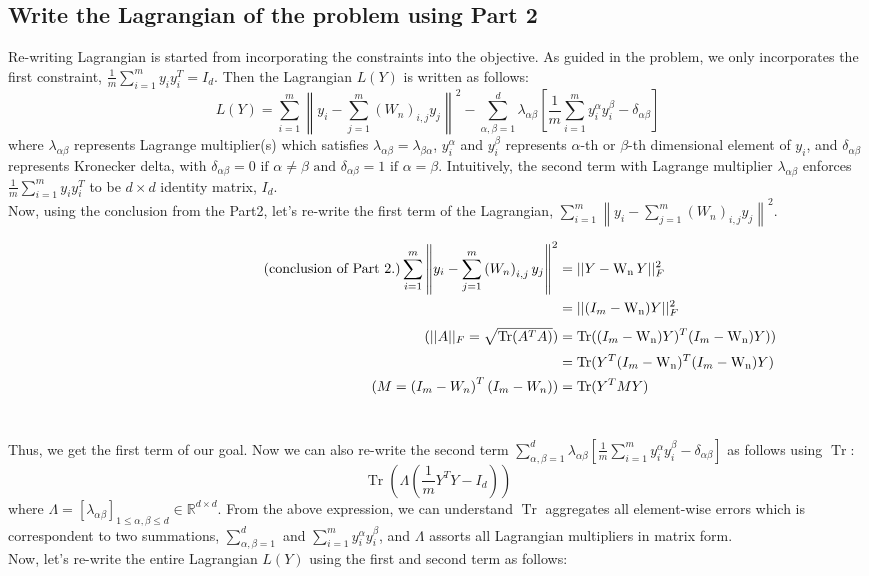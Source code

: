 \documentclass[10pt]{article}
\DeclareMathOperator{\Wn}{W_n}
\newcommand{\comment}[1]{%
  \text{\phantom{(#1)}} \tag{#1}
}
\begin{document}
\subsection{Write the Lagrangian of the problem using Part 2}
\vspace*{1mm}
Re-writing Lagrangian is started from incorporating the constraints into the objective. As guided in the problem, we only incorporates the first constraint, $\frac{1}{m} \sum_{i=1}^{m} y_{i} y_{i}^{T}=I_{d}$. Then the Lagrangian $L(Y)$ is written as follows:
$$
L(Y) = \sum_{i=1}^{m}\left\|y_{i}-\sum_{j=1}^{m}\left(W_{n}\right)_{i, j} y_{j}\right\|^{2} - \sum_{\alpha, \beta =1}^d \lambda_{\alpha\beta}\left[\frac{1}{m}\sum_{i=1}^my_i^\alpha y_i^\beta - \delta_{\alpha\beta}\right]
$$
where $\lambda_{\alpha\beta}$ represents Lagrange multiplier(s) which satisfies $\lambda_{\alpha\beta} = \lambda_{\beta\alpha}$, $y_i^{\alpha}$ and $y_i^{\beta}$ represents $\alpha$-th or $\beta$-th dimensional element of $y_i$, and $\delta_{\alpha\beta}$ represents Kronecker delta, with $\delta_{\alpha \beta}=0 \text { if } \alpha \neq \beta \text { and } \delta_{\alpha \beta}=1 \text { if } \alpha = \beta$.
Intuitively, the second term with Lagrange multiplier $\lambda_{\alpha\beta}$ enforces $\frac{1}{m} \sum_{i=1}^{m} y_{i} y_{i}^{T}$ to be $d \times d$ identity matrix, $I_{d}$. \\
Now, using the conclusion from the Part2, let's re-write the first term of the Lagrangian, $\sum_{i=1}^{m}\left\|y_{i}-\sum_{j=1}^{m}\left(W_{n}\right)_{i, j} y_{j}\right\|^{2}$.

\begin{align*}
\comment{conclusion of Part 2.}\sum_{i=1}^{m}\left\|y_{i}-\sum_{j=1}^{m}\left(W_{n}\right)_{i, j} y_{j}\right\|^{2} &= ||Y-\Wn Y||_F^{2}\\
&= ||(I_m-\Wn)Y||_F^{2}\\
\comment{$||A||_F = \sqrt{\operatorname{Tr}(A^TA)}$}&= \operatorname{Tr}((I_m-\Wn)Y)^T(I_m-\Wn)Y))\\
&= \operatorname{Tr}(Y^T(I_m-\Wn)^T(I_m-\Wn)Y) \\
\comment{$M=\left(I_{m}-W_{n}\right)^{T}\left(I_{m}-W_{n}\right)$}&= \operatorname{Tr}(Y^TMY)
\end{align*}\

\noindent Thus, we get the first term of our goal. Now we can also re-write the second term $\sum_{\alpha, \beta =1}^d \lambda_{\alpha\beta}\left[\frac{1}{m}\sum_{i=1}^my_i^\alpha y_i^\beta - \delta_{\alpha\beta}\right]$ as follows using $\operatorname{Tr}$:
$$\operatorname{Tr}\left(\Lambda\left(\frac{1}{m} Y^{T} Y-I_{d}\right)\right)$$
where $\Lambda=\left[\lambda_{\alpha \beta}\right]_{1 \leq \alpha, \beta \leq d} \in \mathbb{R}^{d \times d}$. From the above expression, we can understand $\operatorname{Tr}$ aggregates all element-wise errors which is correspondent to two summations, $\sum_{\alpha, \beta =1}^d$ and $\sum_{i=1}^my_i^\alpha y_i^\beta$, and $\Lambda$ assorts all Lagrangian multipliers in matrix form.\\
Now, let's re-write the entire Lagrangian $L(Y)$ using the first and second term as follows:
\end{document}
